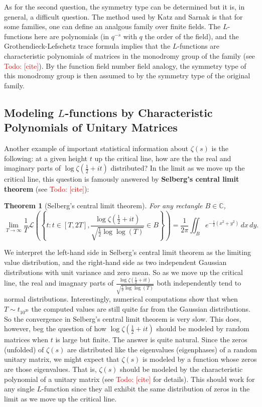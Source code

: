 \documentclass[12pt]{book}
\newtheorem{theorem}{Theorem}[section]
\theoremstyle{definition}\newframedtheorem{method}{Method}
\newcommand{\mc}{\mathcal}
\newcommand{\C}{\mathbb{C}}
\newcommand{\z}{\zeta}
\newcommand{\<}{\langle}
\renewcommand{\>}{\rangle}
\newcommand{\todo}[1]{\textcolor{red}{\sf Todo: [#1]}}
\begin{document}
      As for the second question, the symmetry type can be determined but it is, in general, a difficult question. The method used by Katz and Sarnak is that for some families, one can define an analgous family over finite fields. The $L$-functions here are polynomials (in $q^{-s}$ with $q$ the order of the field), and the Grothendieck-Lefschetz trace formula implies that the $L$-functions are characteristic polynomials of matrices in the monodromy group of the family (see \todo{cite}). By the function field number field analogy, the symmetry type of this monodromy group is then assumed to by the symmetry type of the original family.
    \subsection*{Modeling $L$-functions by Characteristic Polynomials of Unitary Matrices}
      Another example of important statistical information about $\z(s)$ is the following: at a given height $t$ up the critical line, how are the the real and imaginary parts of $\log\z(\frac{1}{2}+it)$ distributed? In the limit as we move up the critical line, this question is famously answered by \textbf{Selberg's central limit theorem} (see \todo{cite}):

      \begin{theorem}[Selberg's central limit theorem]
        For any rectangle $B \in \C$,
        \[
          \lim_{T \to \infty}\frac{1}{T}\mc{L}\left(\left\{t:t \in [T,2T],\frac{\log\z(\frac{1}{2}+it)}{\sqrt{\frac{1}{2}\log\log(T)}} \in B\right\}\right) = \frac{1}{2\pi}\iint_{B}e^{-\frac{1}{2}(x^{2}+y^{2})}\,dx\,dy.
        \]
      \end{theorem}

      We interpret the left-hand side in Selberg's central limit theorem as the limiting value distribution, and the right-hand side as two independent Gaussian distributions with unit variance and zero mean. So as we move up the critical line, the real and imagnary parts of $\frac{\log\z(\frac{1}{2}+it)}{\sqrt{\frac{1}{2}\log\log(T)}}$ both independently tend to normal distributions. Interestingly, numerical computations show that when $T \sim t_{10^{20}}$ the computed values are still quite far from the Gaussian distributions. So the convergence in Selberg's central limit theorem is very slow. This does, however, beg the question of how $\log\z(\frac{1}{2}+it)$ should be modeled by random matrices when $t$ is large but finite. The answer is quite natural. Since the zeros (unfolded) of $\z(s)$ are distributed like the eigenvalues (eigenphases) of a random unitary matrix, we might expect that $\z(s)$ is modeled by a function whose zeros are those eigenvalues. That is, $\z(s)$ should be modeled by the characteristic polynomial of a unitary matrix (see \todo{cite} for details). This should work for any single $L$-function since they all exhibit the same distribution of zeros in the limit as we move up the critical line.
\end{document}
